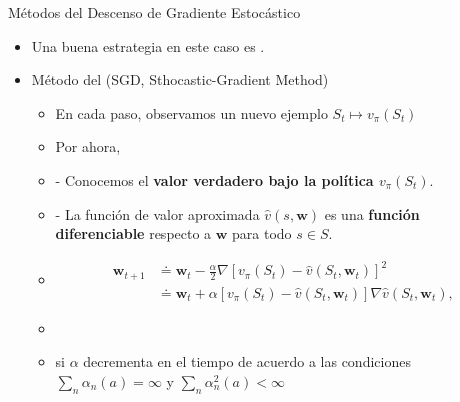 \documentclass[10pt, envcountsect, handout, aspectratio=1610, hyperref={hypertexnames=true}]{beamer}
\begin{document}
\begin{frame}{Métodos del Descenso de Gradiente Estocástico}
\begin{itemize}
		\item Una buena estrategia en este caso es .
		
		\item Método del  (SGD, Sthocastic-Gradient Method)
			\begin{itemize}
				\item En cada paso, observamos un nuevo ejemplo $S_t \mapsto v_\pi(S_t)$
				\item Por ahora, 
				\item[]\qquad - Conocemos el \textbf{valor verdadero bajo la política $v_\pi(S_t)$}.
				\item[]\qquad - La función de valor aproximada $\hat{v}(s, \mathbf{w})$ es una \textbf{función diferenciable} respecto a $\mathbf{w}$ para todo $s \in S$.
				\item {}\vskip-0.9cm
				\begin{align}
					\mathbf{w}_{t+1} &\doteq \mathbf{w}_t - \frac{\alpha}{2} \nabla \left[ v_\pi(S_t) - \hat{v}(S_t, \mathbf{w}_t) \right]^2 \tag{9.4} \\
					&\doteq \mathbf{w}_t + \alpha \left[ v_\pi(S_t) - \hat{v}(S_t, \mathbf{w}_t) \right] \nabla \hat{v}(S_t, \mathbf{w}_t), \tag{9.5}
				\end{align}
				
				\item[]\vskip-0.7cm
				
				\item {} si $\alpha$ decrementa en el tiempo de acuerdo a las condiciones $\sum_n \alpha_n(a)=\infty$ y $\sum_n \alpha^2_n(a)<\infty$
			\end{itemize}
	\end{itemize}
\end{frame}



\end{document}
